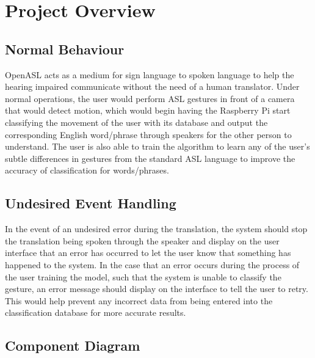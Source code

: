 \documentclass[12pt, titlepage]{article}
\begin{document}
\section{Project Overview}

\subsection{Normal Behaviour}
OpenASL acts as a medium for sign language to spoken language to help the hearing impaired communicate without the need of a human translator. 
Under normal operations, the user would perform ASL gestures in front of a camera that would detect motion, which would begin having the Raspberry Pi 
start classifying the movement of the user with its database and output the corresponding English word/phrase through speakers for the other person to 
understand. The user is also able to train the algorithm to learn any of the user’s subtle differences in gestures from the standard ASL language to 
improve the accuracy of classification for words/phrases.

\subsection{Undesired Event Handling}
In the event of an undesired error during the translation, the system should stop the translation being spoken through the speaker and display on the 
user interface that an error has occurred to let the user know that something has happened to the system. In the case that an error occurs during the 
process of the user training the model, such that the system is unable to classify the gesture, an error message should display on the interface to 
tell the user to retry. This would help prevent any incorrect data from being entered into the classification database for more accurate results.

\subsection{Component Diagram}
\end{document}
